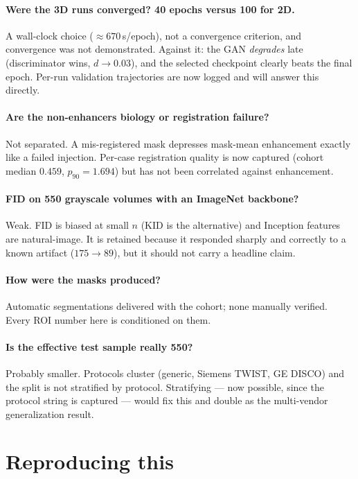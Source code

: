 \documentclass[11pt]{article}
\newcommand{\1}{\mathbb{1}}
\begin{document}
\paragraph{Were the 3D runs converged? 40 epochs versus 100 for 2D.}
A wall-clock choice ($\approx670$\,s/epoch), not a convergence criterion, and convergence
was not demonstrated. Against it: the GAN \emph{degrades} late (discriminator wins,
$d\to0.03$), and the selected checkpoint clearly beats the final epoch. Per-run validation
trajectories are now logged and will answer this directly.

\paragraph{Are the non-enhancers biology or registration failure?}
Not separated. A mis-registered mask depresses mask-mean enhancement exactly like a failed
injection. Per-case registration quality is now captured (cohort median $0.459$,
$p_{90}=1.694$) but has not been correlated against enhancement.

\paragraph{FID on 550 grayscale volumes with an ImageNet backbone?}
Weak. FID is biased at small $n$ (KID is the alternative) and Inception features are
natural-image. It is retained because it responded sharply and correctly to a known artifact
($175\to89$), but it should not carry a headline claim.

\paragraph{How were the masks produced?}
Automatic segmentations delivered with the cohort; none manually verified. Every ROI number
here is conditioned on them.

\paragraph{Is the effective test sample really 550?}
Probably smaller. Protocols cluster (generic, Siemens TWIST, GE DISCO) and the split is not
stratified by protocol. Stratifying --- now possible, since the protocol string is captured
--- would fix this and double as the multi-vendor generalization result.

\section{Reproducing this}
\end{document}
